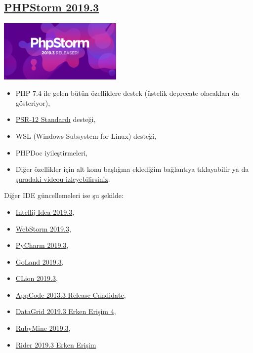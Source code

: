 \documentclass[11pt]{article}
\begin{document}
\subsection{\href{https://blog.jetbrains.com/phpstorm/2019/11/phpstorm-2019-3-release/}{PHPStorm 2019.3}}
\label{sec:org71b3ff5}
\begin{center}
\includegraphics[height=3cm]{gorseller/phpstorm-2019.3.png}
\end{center}

\begin{itemize}
\item PHP 7.4 ile gelen bütün özelliklere destek (üstelik deprecate olacakları da
gösteriyor),
\item \href{https://www.php-fig.org/psr/psr-12/}{PSR-12 Standardı} desteği,
\item WSL (Windows Subsystem for Linux) desteği,
\item PHPDoc iyileştirmeleri,
\item Diğer özellikler için alt konu başlığına eklediğim bağlantıya
tıklayabilir ya da \href{https://www.youtube.com/watch?v=h9KGsD87t\_M}{şuradaki videou izleyebilirsiniz}.
\end{itemize}

Diğer IDE güncellemeleri ise şu şekilde:
\begin{itemize}
\item \href{https://blog.jetbrains.com/idea/2019/11/intellij-idea-2019-3-better-performance-and-quality/}{Intellij Idea 2019.3},
\item \href{https://blog.jetbrains.com/webstorm/2019/11/webstorm-2019-3/}{WebStorm 2019.3},
\item \href{https://blog.jetbrains.com/pycharm/2019/11/pycharm-2019-3-release-candidate/}{PyCharm 2019.3},
\item \href{https://blog.jetbrains.com/go/2019/11/29/goland-2019-3/}{GoLand 2019.3},
\item \href{https://blog.jetbrains.com/clion/2019/11/clion-2019-3-release/}{CLion 2019.3},
\item \href{https://blog.jetbrains.com/objc/2019/11/appcode-2019-3-rc/}{AppCode 2013.3 Release Candidate},
\item \href{https://blog.jetbrains.com/datagrip/2019/11/15/datagrip-2019-3-eap-4/}{DataGrid 2019.3 Erken Erişim 4},
\item \href{https://blog.jetbrains.com/ruby/2019/11/rubymine-2019-3-released/}{RubyMine 2019.3},
\item \href{https://blog.jetbrains.com/dotnet/2019/11/18/new-way-commit-introducing-commit-repository-tool-windows-rider-2019-3-eap/}{Rider 2019.3 Erken Erişim}
\end{itemize}
\end{document}
